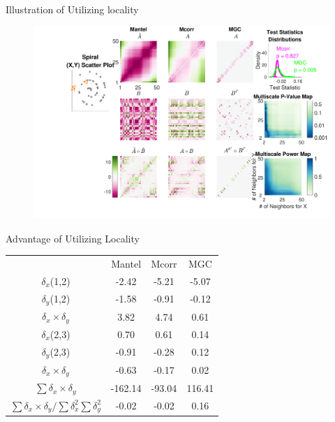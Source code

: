 \documentclass{beamer}
\begin{document}
\begin{frame}{Illustration of Utilizing locality}
\begin{figure}[htbp]
\includegraphics[width=1.0\textwidth]{../Figures/FigA}
\end{figure}
\end{frame}

\begin{frame}{Advantage of Utilizing Locality}
\begin{tabular}{c  c  c  c}
 & Mantel & Mcorr & MGC \\
 $\delta_x$(1,2) & \hspace{1.8em} \color{magenta}-2.42 \hspace{1.8em}  & \hspace{1.8em} \color{magenta}-5.21 \hspace{1.8em} & \hspace{1.8em} \color{magenta}-5.07 \hspace{1.8em}  \\ 
 $\delta_y$(1,2) & \color{magenta}-1.58 & \color{magenta}-0.91 & \color{magenta}-0.12  \\ 
 $\delta_x \times \delta_y$ & \color{blue}3.82 & \color{blue}4.74 & \color{blue}0.61  \\ 
 
\hline


 $\delta_x$(2,3) & \color{blue}0.70 & \color{blue}0.61 & \color{blue}0.14  \\ 
 $\delta_y$(2,3) &  \color{magenta}-0.91 & \color{magenta}-0.28 & \color{blue}0.12  \\ 
 $\delta_x \times \delta_y$ & \color{magenta}-0.63 & \color{magenta}-0.17 & \color{blue}0.02  \\ 

\hline
 $\sum{\delta_x \times \delta_y}$ & \color{magenta}-162.14   & \color{magenta}-93.04 & \color{blue}116.41  \\ 
$\sum{\delta_x \times \delta_y} / \sum{\delta_{x}^2}\sum{\delta_{y}^2}$ &  \color{magenta}-0.02  & \color{magenta}-0.02 & \color{blue}0.16  \\ 

\end{tabular}
\end{frame}
\end{document}
